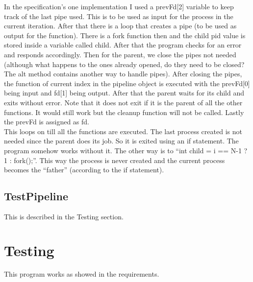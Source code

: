 \documentclass[11pt]{article}
\begin{document}
\begin{description}
\begin{description}
In the specification's one implementation I used a prevFd[2] variable to keep track of the last pipe used. This is to be used as input for the process in the current iteration. After that there is a loop that creates a pipe (to be used as output for the function). There is a fork function then and the child pid value is stored inside a variable called child. After that the program checks for an error and responds accordingly. Then for the parent, we close the pipes not needed (although what happens to the ones already opened, do they need to be closed? The alt method contains another way to handle pipes). After closing the pipes, the function of current index in the pipeline object is executed with the prevFd[0] being input and fd[1] being output. After that the parent waits for its child and exits without error. Note that it does not exit if it is the parent of all the other functions. It would still work but the cleanup function will not be called. Lastly the prevFd is assigned as fd.\\

This loops on till all the functions are executed. The last process created is not needed since the parent does its job. So it is exited using an if statement. The program somehow works without it. The other way is to ``int child = i == N-1 ? 1 : fork();''. This way the process is never created and the current process becomes the ``father'' (according to the if statement).\\
\end{description}
\end{description}

\subsection{TestPipeline}
\label{sec:org5d6cb9a}
This is described in the Testing section.\\


\section{Testing}
\label{sec:org7eebaae}

This program works as showed in the requirements.\\
\end{document}

